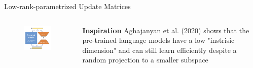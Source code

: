 \documentclass[aspectratio=169,xcolor=dvipsnames]{beamer}
\begin{document}
\begin{frame}{Low-rank-parametrized Update Matrices}
    \begin{columns}
        \begin{column}{0.3\textwidth}
            \begin{figure}
                \centering
                \includegraphics[width=1\linewidth]{figures/LoRA_reparametrization.png}
            \end{figure}
        \end{column}
        \begin{column}{0.7\textwidth}
            \textbf{Inspiration} Aghajanyan et al. (2020) shows that the pre-trained language models have a low "instrisic dimension" and can still learn efficiently despite a random projection to a smaller subspace
        \end{column}
    \end{columns}
\end{frame}

\end{document}
